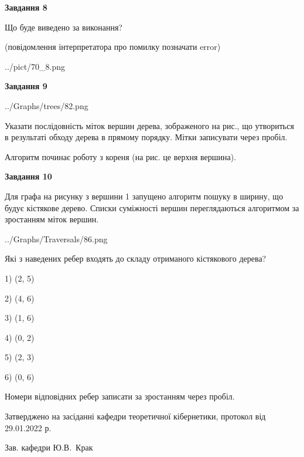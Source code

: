 \documentclass[12pt, ukrainian]{article}
\begin{document}
{\begin {large}
{\begin {center}\textbf{Завдання 8}\end {center}}\par
Що буде виведено за виконання?\par
 (повідомлення інтерпретатора про помилку позначати error)\par
\begin{center}
	{../pict/70_8.png}
\end{center}
\newpage

{\begin {center}\textbf{Завдання 9}\end {center}}\par

\begin{center}
	{../Graphs/trees/82.png}
\end{center}
Указати послідовність міток вершин дерева, зображеного на рис., що утвориться в результаті обходу дерева в прямому порядку. Мітки записувати через пробіл.\par Алгоритм починає роботу з кореня (на рис. це верхня вершина).\par
\newpage

{\begin {center}\textbf{Завдання 10}\end {center}}\par
Для графа на рисунку з вершини 1 запущено алгоритм пошуку в ширину, що будує кістякове дерево. Списки суміжності вершин переглядаються алгоритмом за зростанням міток вершин.\par
\begin{center}
	{../Graphs/Traversals/86.png}
\end{center}
\par Які з наведених ребер входять до складу отриманого кістякового дерева?\par
1) (2, 5)\par
2) (4, 6)\par
3) (1, 6)\par
4) (0, 2)\par
5) (2, 3)\par
6) (0, 6)\par
{\vskip 15pt} Номери відповідних ребер записати за зростанням через пробіл.\par
\newpage


\end {large}
}
{\smallskip \begin {small} Затверджено на засіданні кафедри теоретичної кібернетики, протокол  від   29.01.2022 р.\par\smallskip\smallskip
{\parbox {6.5 cm}{Зав. кафедри \dotfill Ю.В.~Крак}} \end{small}}
\end{document}
